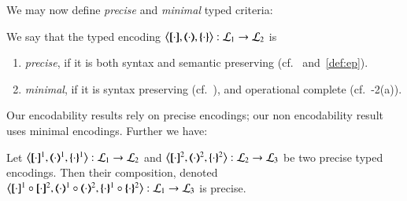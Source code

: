 \smallskip 


We may now define \emph{precise} and \emph{minimal} typed criteria: 

\smallskip 

\begin{definition}\rm\label{def:goodenc}
We say that 
	the typed encoding 
	$\enco{\map{\cdot}, \mapt{\cdot}, \mapa{\cdot}}: \tyl{L}_1 \to \tyl{L}_2$ is 
	\begin{enumerate}[$\bullet$]
	\item \emph{precise}, if it is both syntax and semantic preserving (cf.~ and~\ref{def:ep}).
	\item \emph{minimal}, if it is syntax preserving 
	(cf.~),
	and operational complete (cf.~-2(a)).
	\end{enumerate}
\end{definition}

\smallskip 

\noi %
Our encodability results %
rely on precise encodings; 
our non encodability result %
uses minimal encodings.
Further we have:

\smallskip 

\begin{proposition}\rm
	\label{pro:composition}
	Let %
	$\enco{\map{\cdot}^{1}, \mapt{\cdot}^{1}, \mapa{\cdot}^{1}}: \tyl{L}_1 \to \tyl{L}_2$
	and 
	$\enco{\map{\cdot}^{2}, \mapt{\cdot}^{2}, \mapa{\cdot}^{2}}: \tyl{L}_2 \to \tyl{L}_3$
	be two precise typed encodings.
	Then their composition, denoted 
	$\enco{\map{\cdot}^{1} \circ \map{\cdot}^{2}, \mapt{\cdot}^{1} \circ \mapt{\cdot}^{2}, \mapa{\cdot}^{1}\circ \mapa{\cdot}^{2}}: \tyl{L}_1 \to \tyl{L}_3$
	is precise. 
\end{proposition}


